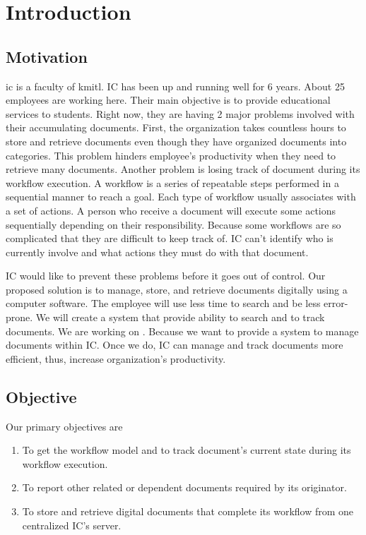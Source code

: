 \chapter{Introduction}

\section{Motivation}
\gls{ic} is a faculty of \gls{kmitl}. 
IC has been up and running well for 6 years.
About 25 employees are working here. %
Their main objective is to provide educational services to students. 
Right now, they are having 2 major problems involved with their accumulating documents.
First, the organization takes countless hours to store and retrieve documents even though they have organized documents into categories. 
This problem hinders employee's productivity when they need to retrieve many documents. 
Another problem is losing track of document during its workflow execution. 
A workflow is a series of repeatable steps performed in a sequential manner to reach a goal.
Each type of workflow usually associates with a set of actions. 
A person who receive a document will execute some actions sequentially depending on their responsibility.
Because some workflows are so complicated that they are difficult to keep track of.
IC can't identify who is currently involve and what actions they must do with that document.

IC would like to prevent these problems before it goes out of control. 
Our proposed solution is to manage, store, and retrieve documents digitally using a computer software.
The employee will use less time to search and be less error-prone.
We will create a system that provide ability to search and to track documents.
We are working on \dms.
Because we want to provide a system to manage documents within IC.
Once we do, IC can manage and track documents more efficient, thus, increase organization's productivity.

\section{Objective}
Our primary objectives are
\begin{enumerate}
\item To get the workflow model and to track document's current state during its workflow execution. 
\item To report other related or dependent documents required by its originator.
\item To store and retrieve digital documents that complete its workflow from one centralized IC's server.
\end{enumerate}

